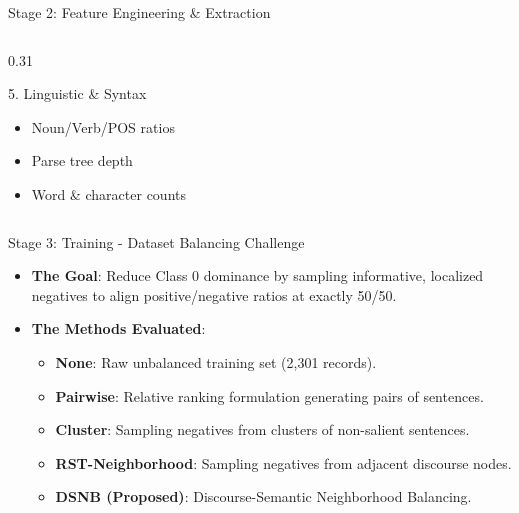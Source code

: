 \documentclass[aspectratio=169]{beamer}
\begin{document}
\begin{frame}{Stage 2: Feature Engineering \& Extraction}
\begin{columns}[t]
\begin{column}{0.31\textwidth}
            \begin{block}{5. Linguistic \& Syntax}
                \begin{itemize}
                    \item Noun/Verb/POS ratios
                    \item Parse tree depth
                    \item Word \& character counts
                \end{itemize}
            \end{block}
        \end{column}
    \end{columns}
\end{frame}

\begin{frame}{Stage 3: Training - Dataset Balancing Challenge}
    \begin{itemize}
        \item \textbf{The Goal}: Reduce Class 0 dominance by sampling informative, localized negatives to align positive/negative ratios at exactly 50/50.
        \vspace{0.2cm}
        \item \textbf{The Methods Evaluated}:
            \begin{itemize}
                \item \textbf{None}: Raw unbalanced training set (2,301 records).
                \item \textbf{Pairwise}: Relative ranking formulation generating pairs of sentences.
                \item \textbf{Cluster}: Sampling negatives from clusters of non-salient sentences.
                \item \textbf{RST-Neighborhood}: Sampling negatives from adjacent discourse nodes.
                \item \textbf{DSNB (Proposed)}: Discourse-Semantic Neighborhood Balancing.
            \end{itemize}
    \end{itemize}
\end{frame}
\end{document}
